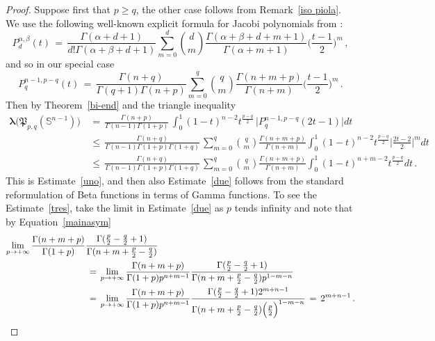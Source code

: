 \documentclass[12pt]{amsart}
\numberwithin{subsection}{section}
\theoremstyle{definition}
\theoremstyle{remark}
\begin{document}
\begin{proof}
Suppose first that  $p \geq q $, the other case follows from Remark~\ref{iso piola}. We use the following well-known explicit formula for Jacobi polynomials from \cite[Equation (4.21.2)]{szeg1939orthogonal}:
    \[
  P_d^{\alpha, \beta} (t)
  \,= \,
    \frac{\Gamma(\alpha + d +1)}{d!\Gamma(\alpha + \beta +d+1)}
          \sum_{m=0}^{d} \binom{d}{m}
    \frac{\Gamma(\alpha + \beta + d + m +1)}{\Gamma(\alpha+m +1)}
    \bigg( \frac{t-1}{2}\bigg)^m\,,
      \]
      and so in our special case
        \[
  P_q^{n-1, p-q} (t)
   \,= \,
    \frac{\Gamma(n+q)}{\Gamma(q+1)\Gamma(n+p)}
                 \sum_{m=0}^{q} \binom{q}{m}
                     \frac{\Gamma(n+m+p)}{\Gamma(n+m)}
    \bigg( \frac{t-1}{2}\bigg)^m\,.
      \]
      Then by Theorem~\ref{bi-end} and the triangle inequality
    \begin{align*}
  \boldsymbol{\lambda}\big(\mathfrak{P}_{p,q}(\mathbb{S}^{n-1})\big)
  &
    \,= \, \frac{\Gamma(n + p )}{\Gamma(n-1)\Gamma( 1 + p  )}
    \, \int_{0}^{1} (1-t)^{n-2} t^{\frac{p-q}{2}} \,\big| P_{ q}^{n-1,p-q}(2t -1)\big| dt
    \\&
    \,\leq \, \frac{\Gamma(n +q )}{\Gamma(n-1)\Gamma( 1 + p  )\Gamma( 1 + q  )}
    \,
    \sum_{m=0}^{q} \binom{q}{m}
                     \frac{\Gamma(n+m+p)}{\Gamma(n+m)}
                      \int_{0}^{1} (1-t)^{n-2} t^{\frac{p-q}{2}}
    \bigg| \frac{2t-2}{2}\bigg|^m dt
    \\&
    \,\leq \, \frac{\Gamma(n +q )}{\Gamma(n-1)\Gamma( 1 + p  )\Gamma( 1 + q  )}
    \,
    \sum_{m=0}^{q} \binom{q}{m}
                     \frac{\Gamma(n+m+p)}{\Gamma(n+m)}
                      \int_{0}^{1} (1-t)^{n+m-2} t^{\frac{p-q}{2}}
     dt\,.
\end{align*}
This is Estimate~\eqref{uno}, and then also Estimate~\eqref{due} follows from the standard reformulation of Beta functions in terms of Gamma functions.
To see the Estimate~\eqref{tres}, take the limit in Estimate~\eqref{due} as  $p $ tends infinity and
note  that by Equation~\eqref{mainasym}
\begin{align*}
\lim_{p \to + \infty} \frac{\Gamma(n+m+p)}{\Gamma(1+p)}
&
    \frac{\Gamma(\frac{p}{2}-\frac{q}{2}+1)}{\Gamma(n+m+\frac{p}{2}-\frac{q}{2})}
    \\&
    \,=\,
\lim_{p \to + \infty} \frac{\Gamma(n+m+p)}{\Gamma(1+p) p^{n+m-1}}
    \frac{\Gamma(\frac{p}{2}-\frac{q}{2}+1)}{\Gamma(n+m+\frac{p}{2}-\frac{q}{2})  p^{1-m-n}
        }
        \\&
    \,=\,
\lim_{p \to + \infty} \frac{\Gamma(n+m+p)}{\Gamma(1+p) p^{n+m-1}}
    \frac{\Gamma(\frac{p}{2}-\frac{q}{2}+1) 2^{m+n-1}}{\Gamma(n+m+\frac{p}{2}-\frac{q}{2}) \Big(\frac{p}{2}\Big)^{1-m-n}}\,=\,  2^{m+n-1}\,.
    \qedhere
  \end{align*}
\end{proof}
\end{document}
